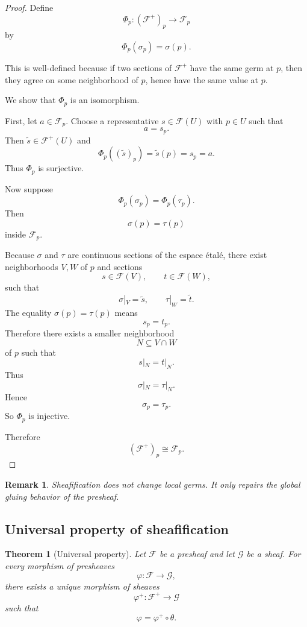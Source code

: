 \documentclass[12pt,a4paper]{article}
\theoremstyle{notespace}
\newtheorem{theorem}[definition]{Theorem}
\newtheorem{remark}[definition]{Remark}
\begin{document}
\begin{proof}
	Define
	\[
	\Phi_p : (\mathcal F^+)_p \longrightarrow \mathcal F_p
	\]
	by
	\[
	\Phi_p(\sigma_p)=\sigma(p).
	\]
	
	This is well-defined because if two sections of $\mathcal F^+$ have the same
	germ at $p$, then they agree on some neighborhood of $p$, hence have the same
	value at $p$.
	
	We show that $\Phi_p$ is an isomorphism.
	
	First, let $a \in \mathcal F_p$.
	Choose a representative $s \in \mathcal F(U)$ with $p \in U$ such that
	\[
	a=s_p.
	\]
	Then $\widetilde{s} \in \mathcal F^+(U)$ and
	\[
	\Phi_p((\widetilde{s})_p)
	=
	\widetilde{s}(p)
	=
	s_p
	=
	a.
	\]
	Thus $\Phi_p$ is surjective.
	
	Now suppose
	\[
	\Phi_p(\sigma_p)=\Phi_p(\tau_p).
	\]
	Then
	\[
	\sigma(p)=\tau(p)
	\]
	inside $\mathcal F_p$.
	
	Because $\sigma$ and $\tau$ are continuous sections of the espace \'{e}tal\'{e},
	there exist neighborhoods $V,W$ of $p$ and sections
	\[
	s \in \mathcal F(V),
	\qquad
	t \in \mathcal F(W),
	\]
	such that
	\[
	\sigma|_V=\widetilde{s},
	\qquad
	\tau|_W=\widetilde{t}.
	\]
	The equality $\sigma(p)=\tau(p)$ means
	\[
	s_p=t_p.
	\]
	Therefore there exists a smaller neighborhood
	\[
	N \subseteq V \cap W
	\]
	of $p$ such that
	\[
	s|_N=t|_N.
	\]
	Thus
	\[
	\sigma|_N=\tau|_N.
	\]
	Hence
	\[
	\sigma_p=\tau_p.
	\]
	So $\Phi_p$ is injective.
	
	Therefore
	\[
	(\mathcal F^+)_p \cong \mathcal F_p.
	\]
\end{proof}

\begin{remark}
	Sheafification does not change local germs.
	It only repairs the global gluing behavior of the presheaf.
\end{remark}

\subsection{Universal property of sheafification}
\begin{theorem}[Universal property]
	Let $\mathcal F$ be a presheaf and let $\mathcal G$ be a sheaf.
	For every morphism of presheaves
	\[
	\varphi : \mathcal F \longrightarrow \mathcal G,
	\]
	there exists a unique morphism of sheaves
	\[
	\varphi^+ : \mathcal F^+ \longrightarrow \mathcal G
	\]
	such that
	\[
	\varphi=\varphi^+ \circ \theta.
	\]
\end{theorem}
\end{document}
